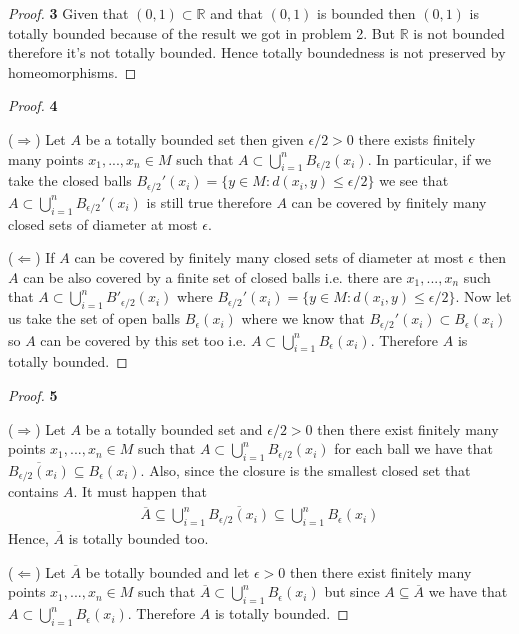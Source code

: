 \documentclass[11pt]{article}
\newcommand{\R}{\mathbb{R}}
\theoremstyle{definition}
\begin{document}
	\begin{proof}{\textbf{3}}
        Given that $(0,1) \subset \R$ and that $(0,1)$ is bounded then $(0,1)$
        is totally bounded because of the result we got in problem 2. But $\R$
        is not bounded therefore it's not totally bounded. Hence totally
        boundedness is not preserved by homeomorphisms. 
    \end{proof}
\cleardoublepage
	\begin{proof}{\textbf{4}}

        ($\Rightarrow$) Let $A$ be a totally bounded set then given $\epsilon/2 > 0$
        there exists finitely many points $x_1, ..., x_n \in M$ such that
        $A \subset \bigcup_{i=1}^n B_{\epsilon/2}(x_i)$. In particular,
        if we take the closed balls
        $B_{\epsilon/2}'(x_i) = \{y \in M : d(x_i,y) \leq \epsilon/2 \}$
        we see that $A \subset \bigcup_{i=1}^n B_{\epsilon/2}'(x_i)$ is still
        true therefore $A$ can be covered by finitely many closed sets of
        diameter at most $\epsilon$.

        ($\Leftarrow$) If $A$ can be covered by finitely many closed sets of
        diameter at most $\epsilon$ then $A$ can be also covered by
        a finite set of closed balls i.e. there are $x_1, ..., x_n$ such that
        $A \subset \bigcup_{i=1}^n B'_{\epsilon/2}(x_i)$ where 
        $B_{\epsilon/2}'(x_i) = \{y \in M : d(x_i,y) \leq \epsilon/2 \}$.
        Now let us take the set of open balls $B_\epsilon(x_i)$ where we know
        that $B_{\epsilon/2}'(x_i) \subset B_\epsilon(x_i)$ so $A$ can be
        covered by this set too i.e.
        $A \subset \bigcup_{i=1}^n B_{\epsilon}(x_i)$.
        Therefore $A$ is totally bounded.
    \end{proof}
	\begin{proof}{\textbf{5}}

        ($\Rightarrow$) Let $A$ be a totally bounded set and $\epsilon/2 > 0$
        then there exist finitely many points $x_1, ..., x_n \in M$ such that
        $A \subset \bigcup_{i=1}^n B_{\epsilon/2} (x_i)$ for each ball we have
        that $\overline{B_{\epsilon/2} (x_i)} \subseteq B_{\epsilon}(x_i)$.
        Also, since the closure is the smallest closed set that contains $A$.
        It must happen that
        \begin{align*}
            \overline{A} \subseteq \bigcup_{i=1}^n \overline{B_{\epsilon/2} (x_i)}
            \subseteq \bigcup_{i=1}^n B_{\epsilon}(x_i)
        \end{align*} 
        Hence, $\overline{A}$ is totally bounded too.
    
        ($\Leftarrow$) Let $\overline{A}$ be totally bounded and let
        $\epsilon > 0$ then there exist finitely many points
        $x_1, ..., x_n \in M$ such that
        $\overline{A} \subset \bigcup_{i=1}^n B_{\epsilon} (x_i)$
        but since $A \subseteq \overline{A}$ we have that 
        $A \subset \bigcup_{i=1}^n B_{\epsilon} (x_i)$.
        Therefore $A$ is totally bounded.
    \end{proof}
\end{document}
